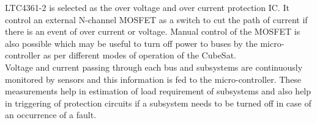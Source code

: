 LTC4361-2 is selected as the over voltage and over current protection IC. It control an external N-channel MOSFET as a switch to cut the path of current if there is an event of over current or voltage. Manual control of the MOSFET is also possible which may be useful to turn off power to buses by the micro-controller as per different modes of operation of the CubeSat.
\\

 Voltage and current passing through each bus and subsystems are continuously monitored by sensors and this information is fed to the micro-controller. These measurements help in estimation of load requirement of subsystems and also help in triggering of protection circuits if a subsystem needs to be turned off in case of an occurrence of a fault. 
 \\
 

